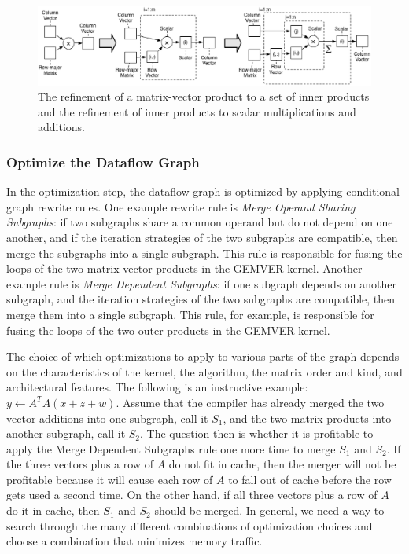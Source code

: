 \documentclass[runningheads]{llncs}
\begin{document}
\begin{figure}[hbtp]
  \centering
  \includegraphics[width=\textwidth]{figures/refine-mv-dot.eps}

  \caption{The refinement of a matrix-vector product to a set of inner products and the refinement of inner products to scalar multiplications and additions.}
  \label{fig:refine-mv-dot}
\end{figure}




\subsubsection{Optimize the Dataflow Graph}

In the optimization step, the dataflow graph is optimized by applying conditional graph rewrite rules.  One example rewrite rule is \emph{Merge Operand Sharing Subgraphs}: if two subgraphs share a common operand but do not depend on one another, and if the iteration strategies of the two subgraphs are compatible, then merge the subgraphs into a single subgraph.  This rule is responsible for fusing the loops of the two matrix-vector products in the GEMVER kernel.  Another example rule is \emph{Merge Dependent Subgraphs}: if one subgraph depends on another subgraph, and the iteration strategies of the two subgraphs are compatible, then merge them into a single subgraph.  This rule, for example, is responsible for fusing the loops of the two outer products in the GEMVER kernel.

The choice of which optimizations to apply to various parts of the graph depends on the characteristics of the kernel, the algorithm, the matrix order and kind, and architectural features.  The following is an instructive example: $y \gets A^T A (x + z + w)$.  Assume that the compiler has already merged the two vector additions into one subgraph, call it $S_1$, and the two matrix products into another subgraph, call it $S_2$. The question then is whether it is profitable to apply the Merge Dependent Subgraphs rule one more time to merge $S_1$ and $S_2$. If the three vectors plus a row of $A$ do not fit in cache, then the merger will not be profitable because it will cause each row of $A$ to fall out of cache before the row gets used a second time.  On the other hand, if all three vectors plus a row of $A$ do it in cache, then $S_1$ and $S_2$ should be merged.  In general, we need a way to search through the many different combinations of optimization choices and choose a combination that minimizes memory traffic.
\end{document}
